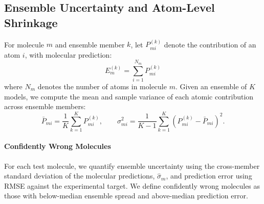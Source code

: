 \documentclass{article}
\begin{document}
\subsection{Ensemble Uncertainty and Atom-Level Shrinkage}

For molecule $m$ and ensemble member $k$, let $P_{mi}^{(k)}$ denote the contribution of an atom $i$, with molecular prediction:
\begin{equation}
    E_m^{(k)} = \sum_{i=1}^{N_m} P_{mi}^{(k)} 
\end{equation}
where $N_m$ denotes the number of atoms in molecule $m$. 
Given an ensemble of $K$ models, we compute the mean and sample variance of each atomic contribution across ensemble members:
\[
\bar{P}_{mi}=\frac{1}{K}\sum_{k=1}^{K}P_{mi}^{(k)},
\qquad
\sigma_{mi}^2=\frac{1}{K-1}\sum_{k=1}^{K}\left(P_{mi}^{(k)}-\bar{P}_{mi}\right)^2.
\]


\paragraph{Confidently Wrong Molecules} For each test molecule, we quantify ensemble uncertainty using the cross-member standard deviation of the molecular predictions, $\hat{\sigma}_m$, and prediction error using RMSE against the experimental target. We define confidently wrong molecules as those with below-median ensemble spread and above-median prediction error.

\end{document}
